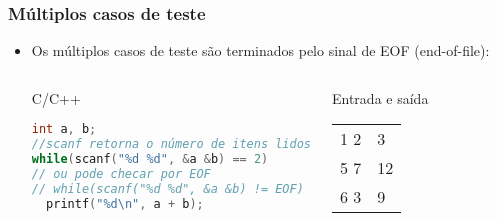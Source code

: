 \begin{frame} [fragile]
  \frametitle{Múltiplos casos de teste}
    \begin{itemize}
      \item {\small Os múltiplos casos de teste são terminados pelo sinal de EOF (end-of-file):}
      \begin{columns}
      \begin{block:ie}{C/C++}
	\begin{lstlisting}[language=c]
int a, b;
//scanf retorna o número de itens lidos
while(scanf("%d %d", &a &b) == 2)
// ou pode checar por EOF
// while(scanf("%d %d", &a &b) != EOF)
  printf("%d\n", a + b);
	\end{lstlisting}
      \end{block:ie}

      \begin{block:ie}{Entrada e saída}
	\begin{tabularx}{\textwidth}{|X|X|}
	  1 2&3\\5 7&12\\6 3&9
	\end{tabularx}
      \end{block:ie}
    \end{columns}
  \end{itemize}
\end{frame}

